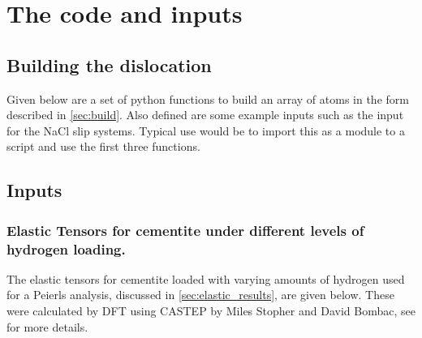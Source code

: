 \chapter{The code and inputs}

\section{Building the dislocation}
\label{sec:building_disloc_code}

Given below are a set of python functions to build an array of atoms in the form described in \autoref{sec:build}. Also defined are some example inputs such as the input for the NaCl slip systems.
 Typical use would be to import this as a module to a script and use the first three functions.
 
 


\section{Inputs}
\label{sec:pyerls_inputs}

\subsection{Elastic Tensors for cementite under different levels of hydrogen loading.}
\label{sec:elastic_tensors}

The elastic tensors for cementite loaded with varying amounts of hydrogen used for a Peierls analysis, discussed in \autoref{sec:elastic_results}, are given below. These were calculated by DFT using CASTEP \cite{Clark2005} by Miles Stopher and David Bombac, see \cite{Stopher2017} for more details. 

